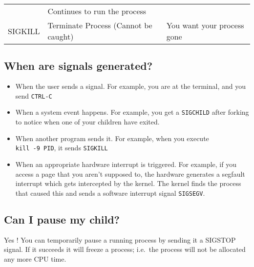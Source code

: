 \begin{longtable}[c]{@{}lll@{}}
\begin{minipage}[t]{0.44\columnwidth}
\strut\end{minipage} &
\begin{minipage}[t]{0.35\columnwidth}\raggedright\strut
Continues to run the process
\strut\end{minipage}\tabularnewline
\begin{minipage}[t]{0.12\columnwidth}\raggedright\strut
SIGKILL
\strut\end{minipage} &
\begin{minipage}[t]{0.44\columnwidth}\raggedright\strut
Terminate Process (Cannot be caught)
\strut\end{minipage} &
\begin{minipage}[t]{0.35\columnwidth}\raggedright\strut
You want your process gone
\strut\end{minipage}\tabularnewline
\bottomrule
\end{longtable}

\subsection{When are signals
generated?}\label{when-are-signals-generated}

\begin{itemize}
\tightlist
\item
  When the user sends a signal. For example, you are at the terminal,
  and you send \texttt{CTRL-C}
\item
  When a system event happens. For example, you get a \texttt{SIGCHILD}
  after forking to notice when one of your children have exited.
\item
  When another program sends it. For example, when you execute
  \texttt{kill\ -9\ PID}, it sends \texttt{SIGKILL}
\item
  When an appropriate hardware interrupt is triggered. For example, if
  you access a page that you aren't supposed to, the hardware generates
  a segfault interrupt which gets intercepted by the kernel. The kernel
  finds the process that caused this and sends a software interrupt
  signal \texttt{SIGSEGV}.
\end{itemize}

\subsection{Can I pause my child?}\label{can-i-pause-my-child}

Yes ! You can temporarily pause a running process by sending it a
SIGSTOP signal. If it succeeds it will freeze a process; i.e.~the
process will not be allocated any more CPU time.

